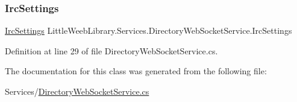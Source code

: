 \subsubsection{\texorpdfstring{Irc\+Settings}{IrcSettings}}
{\footnotesize\ttfamily \mbox{\hyperlink{class_little_weeb_library_1_1_settings_1_1_irc_settings}{Irc\+Settings}} Little\+Weeb\+Library.\+Services.\+Directory\+Web\+Socket\+Service.\+Irc\+Settings\hspace{0.3cm}{\ttfamily [private]}}



Definition at line 29 of file Directory\+Web\+Socket\+Service.\+cs.



The documentation for this class was generated from the following file\+:\begin{DoxyCompactItemize}
\item 
Services/\mbox{\hyperlink{_directory_web_socket_service_8cs}{Directory\+Web\+Socket\+Service.\+cs}}\end{DoxyCompactItemize}
